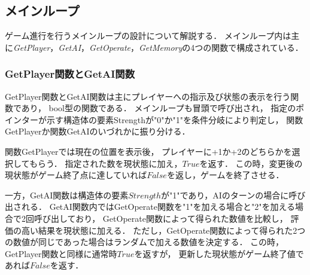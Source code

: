 \documentclass[a4paper,10pt]{jsarticle}
\begin{document}
\subsection{メインループ}
ゲーム進行を行うメインループの設計について解説する．
メインループ内は主に\textit{GetPlayer}，\textit{GetAI}，\textit{GetOperate}，\textit{GetMemory}の4つの関数で構成されている．
\subsubsection{GetPlayer関数とGetAI関数}
GetPlayer関数とGetAI関数は主にプレイヤーへの指示及び状態の表示を行う関数であり，
bool型の関数である．
メインループも冒頭で呼び出され，
指定のポインターが示す構造体の要素Strengthが"0"か"1"を条件分岐により判定し，
関数GetPlayerか関数GetAIのいづれかに振り分ける．\par
関数GetPlayerでは現在の位置を表示後，
プレイヤーに+1か+2のどちらかを選択してもらう．
指定された数を現状態に加え，$True$を返す．
この時，変更後の現状態がゲーム終了点に達していれば$False$を返し，ゲームを終了させる．\par
一方，GetAI関数は構造体の要素$Strength$が"1"であり，AIのターンの場合に呼び出される．
GetAI関数内ではGetOperate関数を"1"を加える場合と"2"を加える場合で2回呼び出しており，
GetOperate関数によって得られた数値を比較し，
評価の高い結果を現状態に加える．
ただし，GetOperate関数によって得られた2つの数値が同じであった場合はランダムで加える数値を決定する．
この時，GetPlayer関数と同様に通常時$True$を返すが，
更新した現状態がゲーム終了値であれば$False$を返す．
\end{document}
